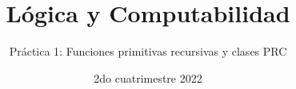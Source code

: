 

\title{Lógica y Computabilidad}
\author{Práctica 1: Funciones primitivas recursivas y clases PRC}
\date{2do cuatrimestre 2022}



\maketitle


















